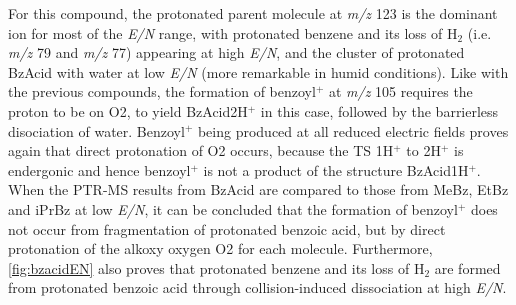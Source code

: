 



For this compound, the protonated parent molecule at \textit{m/z} 123 is the dominant ion for most of the \textit{E/N} range, with protonated benzene and its loss of H$_2$ (i.e. \textit{m/z} 79 and \textit{m/z} 77) appearing at high \textit{E/N}, and the cluster of protonated BzAcid with water at low \textit{E/N} (more remarkable in humid conditions).
%
Like with the previous compounds, the formation of benzoyl$^+$ at \textit{m/z} 105 requires the proton to be on O2, to yield BzAcid2H$^+$ in this case, followed by the barrierless disociation of water.
%
Benzoyl$^+$ being produced at all reduced electric fields proves again that direct protonation of O2 occurs, because the TS 1H$^+$ to 2H$^+$ is endergonic and hence benzoyl$^+$ is not a product of the structure BzAcid1H$^+$.
%
When the PTR-MS results from BzAcid are compared to those from MeBz, EtBz and iPrBz  at low \textit{E/N}, it can be concluded that the formation of benzoyl$^+$ does not occur from fragmentation of protonated benzoic acid, but by direct protonation of the alkoxy oxygen O2 for each molecule.
%
Furthermore, \autoref{fig:bzacidEN} also proves that protonated benzene and its loss of H$_2$ are formed from protonated benzoic acid through collision-induced dissociation at high \textit{E/N}.



%
%
%
%









